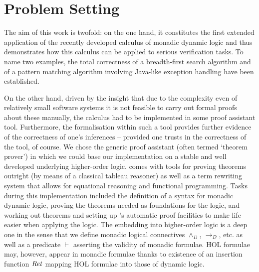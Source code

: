 \section{Problem Setting}
\label{sec:problem-setting}
The aim of this work is twofold: on the one hand, it constitutes the first
extended application of the recently developed calculus of monadic dynamic logic
 and thus demonstrates how this calculus can be
applied to serious verification tasks. To name two examples, the total
correctness of a breadth-first search algorithm and of a pattern matching
algorithm involving Java-like exception handling have been established. 

On the other hand, driven by the insight that due to the complexity even of
relatively small software systems it is not feasible to carry out formal proofs
about these manually, the calculus had to be implemented in some proof assistant
tool. Furthermore, the formalisation within such a tool provides further
evidence of the correctness of one's inferences -- provided one trusts in the
correctness of the tool, of course.
We chose the generic proof assistant (often termed `theorem
prover') \IsabelleHOL in which we could base our implementation on a stable and
well developed underlying higher-order logic. \IsabelleHOL comes with
tools for proving theorems outright (by means of a classical tableau reasoner)
as well as a term rewriting system that allows for equational reasoning and
functional programming. Tasks during this implementation included the definition
of a syntax for monadic dynamic logic, proving the theorems needed as
foundations for the logic, and working out theorems and setting up \Isabelle's
automatic proof facilities to make
life easier when applying the logic. The embedding into higher-order logic is a
deep one in the sense that we define monadic logical connectives $\land_D$, $\longrightarrow_D$,
etc. as well as a predicate $\vdash$ asserting the validity of
monadic formulae. HOL formulae may, however, appear in monadic formulae thanks to
existence of an insertion function $\mathit{Ret}$ mapping HOL formulae into
those of dynamic logic.

